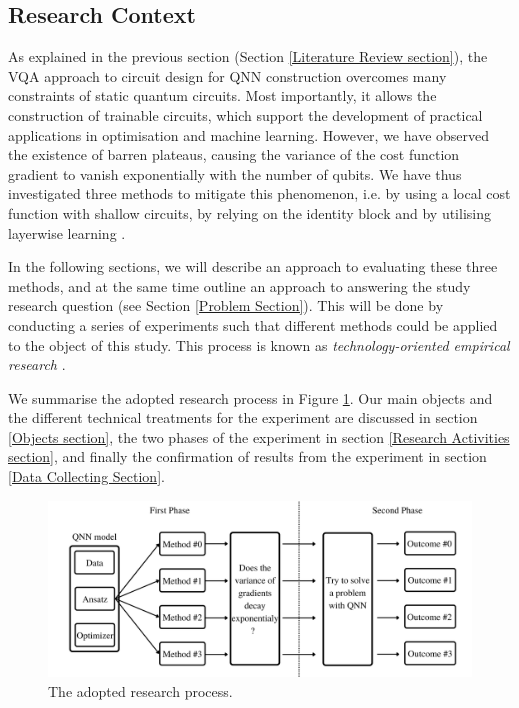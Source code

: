 \subsection{Research Context}

As explained in the previous section (Section \ref{Literature Review section}), the VQA approach to circuit design for QNN construction overcomes many constraints of static quantum circuits. Most importantly, it allows the construction of trainable circuits, which support the development of practical applications in optimisation and machine learning.
However, we have observed the existence of barren plateaus, causing the variance of the cost function gradient to vanish exponentially with the number of qubits.
We have thus investigated three methods to mitigate this phenomenon, i.e. by using a local cost function with shallow circuits, by relying on the identity block and by utilising layerwise learning \cite{cerezoCostFunctionDependent2021, liuParameterInitializationMethod2021, skolikLayerwiseLearningQuantum2021}.

In the following sections, we will describe an approach to evaluating these three methods, and at the same time outline an approach to answering the study research question (see Section \ref{Problem Section}). This will be done by conducting a series of experiments such that different methods could be applied to the object of this study. 
This process is known as \emph{technology-oriented empirical research} \cite[sect 2.4]{wohlinExperimentationSoftwareEngineering2012}.

We summarise the adopted research process in Figure \ref{Research Activities Figure}.
Our main objects and the different technical treatments for the experiment are discussed in section \ref{Objects section}, the two phases of the experiment in section \ref{Research Activities section}, and finally the confirmation of results from the experiment in section \ref{Data Collecting Section}.

\begin{figure}
    \centering
    \includegraphics[width=\textwidth]{./ResearchDesign/Appendices/ExperimentDiagram.png}
    \caption{
        The adopted research process.
    }
    \label{Research Activities Figure}
\end{figure}
